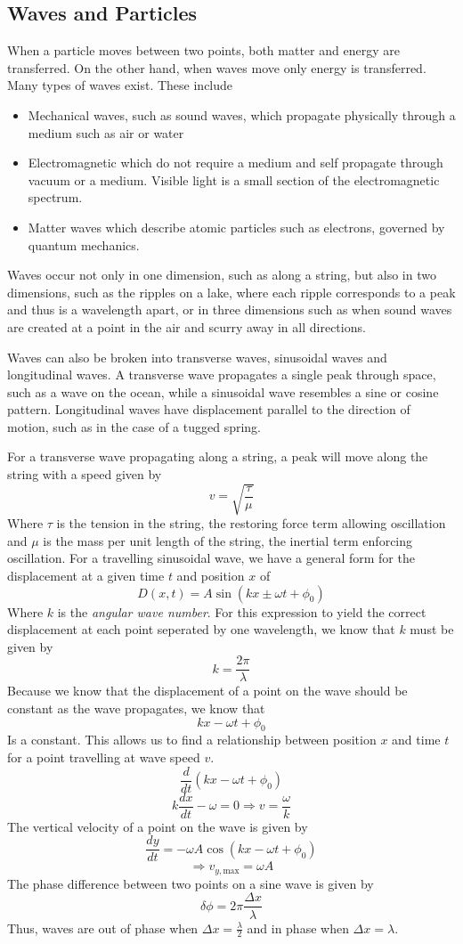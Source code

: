 \documentclass[12pt]{report}
\begin{document}
\begin{flushleft}
\subsection*{Waves and Particles}
When a particle moves between two points, both matter and energy are 
transferred. On the other hand, when waves move only energy is transferred.
Many types of waves exist. These include
\begin{itemize}
    \item Mechanical waves, such as sound waves, which propagate physically
    through a medium such as air or water
    \item Electromagnetic which do not require a medium and self propagate
    through vacuum or a medium. Visible light is a small section of the 
    electromagnetic spectrum.
    \item Matter waves which describe atomic particles such as electrons,
    governed by quantum mechanics.
\end{itemize}
Waves occur not only in one dimension, such as along a string, but also in two
dimensions, such as the ripples on a lake, where each ripple corresponds to a
peak and thus is a wavelength apart, or in three dimensions such as when sound
waves are created at a point in the air and scurry away in all directions.

\bigskip
Waves can also be broken into transverse waves, sinusoidal waves and 
longitudinal waves. A transverse wave propagates a single peak through
space, such as a wave on the ocean, while a sinusoidal wave resembles a
sine or cosine pattern. Longitudinal waves have displacement parallel to the
direction of motion, such as in the case of a tugged spring.

\bigskip
For a transverse wave propagating along a string, a peak will move along
the string with a speed given by
\[v = \sqrt{\frac{\tau}{\mu}}\]
Where \(\tau\) is the tension in the string, the restoring force term allowing
oscillation and \(\mu\) is the mass per unit length of the string, the inertial
term enforcing oscillation. For a travelling sinusoidal wave, we have a general
form for the displacement at a given time \(t\) and position \(x\) of
\[D(x, t) = A\sin(kx \pm \omega t + \phi_0)\]
Where \(k\) is the \textit{angular wave number}. For this expression to yield
the correct displacement at each point seperated by one wavelength, we know 
that \(k\) must be given by
\[k = \frac{2\pi}{\lambda}\]
Because we know that the displacement of a point on the wave should be constant
as the wave propagates, we know that
\[kx - \omega t + \phi_0\]
Is a constant. This allows us to find a relationship between position \(x\) and
time \(t\) for a point travelling at wave speed \(v\).
\[\frac{d}{dt}(kx - \omega t + \phi_0)\]
\[k\frac{dx}{dt} - \omega = 0 \Rightarrow v = \frac{\omega}{k}\]
The vertical velocity of a point on the wave is given by
\[\frac{dy}{dt} = -\omega A \cos(kx - \omega t + \phi_0)\]
\[\Rightarrow v_{y,\mathrm{max}} = \omega A\]
The phase difference between two points on a sine wave is given by
\[\delta \phi = 2\pi \frac{\Delta x}{\lambda}\]
Thus, waves are out of phase when \(\Delta x = \frac{\lambda}{2}\) and in
phase when \(\Delta x = \lambda\).


\end{flushleft}
\end{document}

